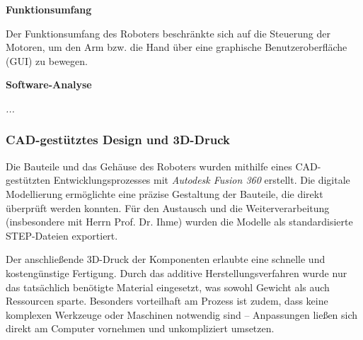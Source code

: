 

\textbf{Funktionsumfang}

Der Funktionsumfang des Roboters beschränkte sich auf die Steuerung der Motoren, um den Arm bzw. die Hand über eine graphische Benutzeroberfläche (GUI) zu bewegen.

\textbf{Software-Analyse}

\textit{...}

\subsubsection{CAD-gestütztes Design und 3D-Druck}

Die Bauteile und das Gehäuse des Roboters wurden mithilfe eines CAD-gestützten Entwicklungsprozesses mit \textit{Autodesk Fusion 360} \cite{fusion360} erstellt. Die digitale Modellierung ermöglichte eine präzise Gestaltung der Bauteile, die direkt überprüft werden konnten. Für den Austausch und die Weiterverarbeitung (insbesondere mit Herrn Prof. Dr. Ihme) wurden die Modelle als standardisierte STEP-Dateien exportiert.

Der anschließende 3D-Druck der Komponenten erlaubte eine schnelle und kostengünstige Fertigung. Durch das additive Herstellungsverfahren wurde nur das tatsächlich benötigte Material eingesetzt, was sowohl Gewicht als auch Ressourcen sparte. Besonders vorteilhaft am Prozess ist zudem, dass keine komplexen Werkzeuge oder Maschinen notwendig sind – Anpassungen ließen sich direkt am Computer vornehmen und unkompliziert umsetzen.

